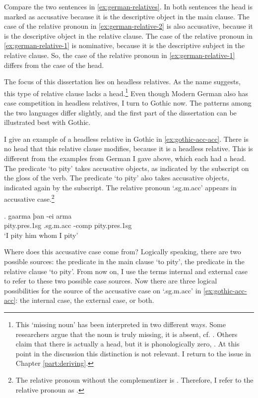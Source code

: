 Compare the two sentences in \ref{ex:german-relatives}. In both sentences the head is marked as accusative because it is the descriptive object in the main clause. The case of the relative pronoun in \ref{ex:german-relative-2} is also accusative, because it is the descriptive object in the relative clause. The case of the relative pronoun in \ref{ex:german-relative-1} is nominative, because it is the descriptive subject in the relative clause. So, the case of the relative pronoun in \ref{ex:german-relative-1} differs from the case of the head.

The focus of this dissertation lies on headless relatives. As the name suggests, this type of relative clause lacks a head.\footnote{
This `missing noun' has been interpreted in two different ways. Some researchers argue that the noun is truly missing, it is absent, cf. \citealt{citko2005,vanriemsdijk2006}. Others claim that there is actually a head, but it is phonologically zero, \citealt{bresnan1978,groos1981,grosu2003}. At this point in the discussion this distinction is not relevant. I return to the issue in Chapter \ref{part:deriving}.
}
Even though Modern German also has case competition in headless relatives, I turn to Gothic now. The patterns among the two languages differ slightly, and the first part of the dissertation can be illustrated best with Gothic.

I give an example of a headless relative in Gothic in \ref{ex:gothic-acc-acc}.
There is no head that this relative clause modifies, because it is a headless relative. This is different from the examples from German I gave above, which each had a head.
The predicate  `to pity' takes accusative objects, as indicated by the subscript on the gloss of the verb. The predicate  `to pity' also takes accusative objects, indicated again by the subscript.
The relative pronoun  `.\ac{sg}.\ac{m}.\ac{acc}' appears in accusative case.\footnote{
The relative pronoun without the complementizer  is . Therefore, I refer to the relative pronoun as .
}

\exg. gaarma þan -ei arma\\
 pity.\ac{pres}.1\ac{sg}\scsub{[acc]} .\ac{sg}.\ac{m}.\ac{acc} -\ac{comp} pity.\ac{pres}.1\ac{sg}\scsub{[acc]}\\
 `I pity him whom I pity' \label{ex:gothic-acc-acc}

Where does this accusative case come from? Logically speaking, there are two possible sources: the predicate in the main clause  `to pity', the predicate in the relative clause  `to pity'. From now on, I use the terms internal and external case to refer to these two possible case sources. Now there are three logical possibilities for the source of the accusative case on  `.\ac{sg}.\ac{m}.\ac{acc}' in \ref{ex:gothic-acc-acc}: the internal case, the external case, or both.

